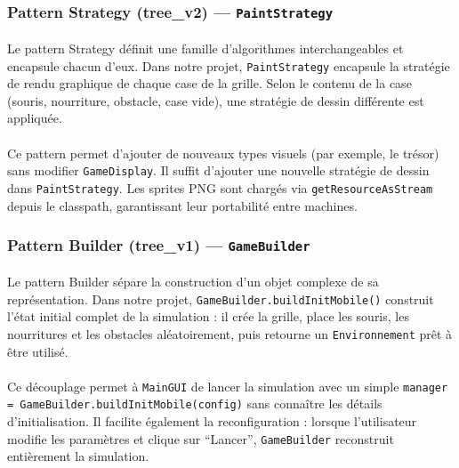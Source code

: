 \subsubsection{Pattern Strategy (tree\_v2) --- \texttt{PaintStrategy}}

\paragraph{} Le pattern Strategy définit une famille d'algorithmes interchangeables et encapsule chacun d'eux. Dans notre projet, \texttt{PaintStrategy} encapsule la stratégie de rendu graphique de chaque case de la grille. Selon le contenu de la case (souris, nourriture, obstacle, case vide), une stratégie de dessin différente est appliquée.

\paragraph{} Ce pattern permet d'ajouter de nouveaux types visuels (par exemple, le trésor) sans modifier \texttt{GameDisplay}. Il suffit d'ajouter une nouvelle stratégie de dessin dans \texttt{PaintStrategy}. Les sprites PNG sont chargés via \texttt{getResourceAsStream} depuis le classpath, garantissant leur portabilité entre machines.

\subsubsection{Pattern Builder (tree\_v1) --- \texttt{GameBuilder}}

\paragraph{} Le pattern Builder sépare la construction d'un objet complexe de sa représentation. Dans notre projet, \texttt{GameBuilder.buildInitMobile()} construit l'état initial complet de la simulation : il crée la grille, place les souris, les nourritures et les obstacles aléatoirement, puis retourne un \texttt{Environnement} prêt à être utilisé.

\paragraph{} Ce découplage permet à \texttt{MainGUI} de lancer la simulation avec un simple \texttt{manager = GameBuilder.buildInitMobile(config)} sans connaître les détails d'initialisation. Il facilite également la reconfiguration : lorsque l'utilisateur modifie les paramètres et clique sur ``Lancer'', \texttt{GameBuilder} reconstruit entièrement la simulation.

